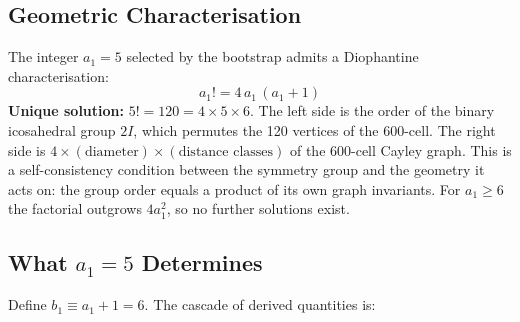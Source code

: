 \documentclass[12pt,a4paper]{article}
\theoremstyle{definition}
\begin{document}
\subsection{Geometric Characterisation}

The integer $a_1 = 5$ selected by the bootstrap admits a Diophantine characterisation:
\begin{equation}
\boxed{a_1! = 4\,a_1\,(a_1 + 1)}
\label{eq:diophantine}
\end{equation}
\textbf{Unique solution:} $5! = 120 = 4 \times 5 \times 6$.  The left side is the order of the binary icosahedral group $2I$, which permutes the 120 vertices of the 600-cell.  The right side is $4 \times (\text{diameter}) \times (\text{distance classes})$ of the 600-cell Cayley graph.  This is a self-consistency condition between the symmetry group and the geometry it acts on: the group order equals a product of its own graph invariants.  For $a_1 \ge 6$ the factorial outgrows $4a_1^2$, so no further solutions exist.

\subsection{What \texorpdfstring{$a_1 = 5$}{a1 = 5} Determines}
\label{sec:cascade}

Define $b_1 \equiv a_1 + 1 = 6$. The cascade of derived quantities is:
\end{document}
